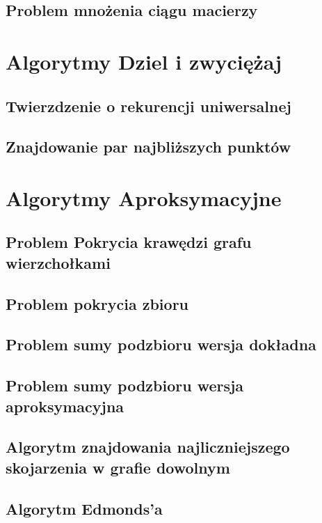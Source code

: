 \documentclass[11pt,a4paper]{article}
\begin{document}
\subsection{Problem mnożenia ciągu macierzy}


\section{Algorytmy Dziel i zwyciężaj}


\subsection{Twierzdzenie o rekurencji uniwersalnej}


\subsection{Znajdowanie par najbliższych punktów}


\section{Algorytmy Aproksymacyjne}


\subsection{Problem Pokrycia krawędzi grafu wierzchołkami}


\subsection{Problem pokrycia zbioru}


\subsection{Problem sumy podzbioru wersja dokładna}


\subsection{Problem sumy podzbioru wersja aproksymacyjna}


\subsection{Algorytm znajdowania najliczniejszego skojarzenia w grafie dowolnym}


\subsection{Algorytm Edmonds'a}

\end{document}
